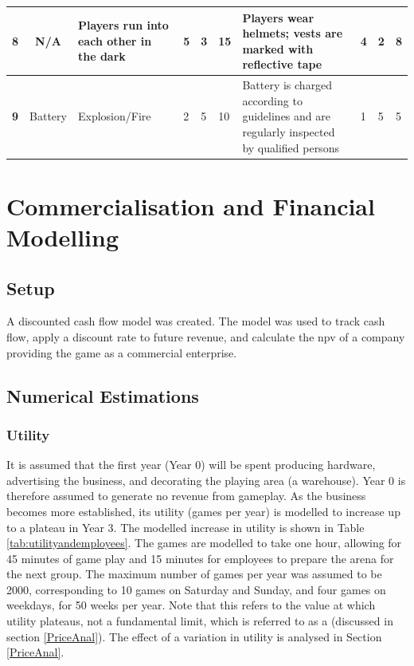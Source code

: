\documentclass{report_template_oxford}
\begin{document}
\begin{table}[h]
\begin{tabular}{|c|c|p{4cm}|p{0.5cm}|p{0.5cm}|p{0.6cm}|p{5cm}|p{0.55cm}|p{0.55cm}|p{0.6cm}|}
\hline
\cellcolor{gray! 30}\textbf{8}&N/A&Players run into each other in the dark&5&3&\cellcolor{red! 85}15&Players wear helmets; vests are marked with reflective tape&4&2&\cellcolor{yellow! 100} 8\\
\hline
\cellcolor{gray! 30}\textbf{9}&Battery&Explosion/Fire&2&5&\cellcolor{orange! 90}10&Battery is charged according to guidelines and are regularly inspected by qualified persons&1&5&\cellcolor{green! 100}5\\
\hline
\end{tabular}
\label{tab:risk-assessment}
\end{table}



\newpage
\section{Commercialisation and Financial Modelling}
\label{commercialisation}
\subsection{Setup}
A discounted cash flow model was created. The model was used to track cash flow, apply a discount rate to future revenue, and calculate the \gls{npv} of a company providing the game as a commercial enterprise.
\subsection{Numerical Estimations} \label{num-est}
\subsubsection{Utility}
It is assumed that the first year (Year 0) will be spent producing hardware, advertising the business, and decorating the playing area (a warehouse). Year 0 is therefore assumed to generate no revenue from gameplay. As the business becomes more established, its utility (games per year) is modelled to increase up to a plateau in Year 3. The modelled increase in utility is shown in Table \ref{tab:utilityandemployees}. The games are modelled to take one hour, allowing for 45 minutes of game play and 15 minutes for employees to prepare the arena for the next group. The maximum number of games per year was assumed to be 2000, corresponding to 10 games on Saturday and Sunday, and four games on weekdays, for 50 weeks per year. Note that this  refers to the value at which utility plateaus, not a fundamental limit, which is referred to as a  (discussed in section \ref{PriceAnal}). The effect of a variation in utility is analysed in Section \ref{PriceAnal}.
\end{document}

